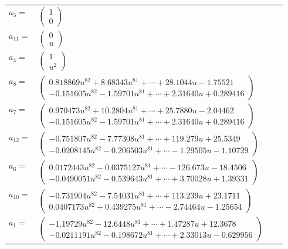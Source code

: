 \documentclass[1p]{elsarticle_modified}
\theoremstyle{definition}
\begin{document}
\begin{tabular}{m{7pt} m{180pt} m{7pt} m{180pt} }
\flushright $a_{5}=$&$\begin{pmatrix}1\\0\end{pmatrix}$ \\
\flushright $a_{11}=$&$\begin{pmatrix}0\\u\end{pmatrix}$ \\
\flushright $a_{4}=$&$\begin{pmatrix}1\\u^2\end{pmatrix}$ \\
\flushright $a_{8}=$&$\begin{pmatrix}0.818869 u^{82}+8.68343 u^{81}+\cdots+28.1044 u-1.75521\\-0.151605 u^{82}-1.59701 u^{81}+\cdots+2.31640 u+0.289416\end{pmatrix}$ \\
\flushright $a_{7}=$&$\begin{pmatrix}0.970473 u^{82}+10.2804 u^{81}+\cdots+25.7880 u-2.04462\\-0.151605 u^{82}-1.59701 u^{81}+\cdots+2.31640 u+0.289416\end{pmatrix}$ \\
\flushright $a_{12}=$&$\begin{pmatrix}-0.751807 u^{82}-7.77308 u^{81}+\cdots+119.279 u+25.5349\\-0.0208145 u^{82}-0.206503 u^{81}+\cdots-1.29505 u-1.10729\end{pmatrix}$ \\
\flushright $a_{6}=$&$\begin{pmatrix}0.0172443 u^{82}-0.0375127 u^{81}+\cdots-126.673 u-18.4506\\-0.0490051 u^{82}-0.539643 u^{81}+\cdots+3.70028 u+1.39331\end{pmatrix}$ \\
\flushright $a_{10}=$&$\begin{pmatrix}-0.731904 u^{82}-7.54031 u^{81}+\cdots+113.239 u+23.1711\\0.0407173 u^{82}+0.439275 u^{81}+\cdots-2.74464 u-1.25654\end{pmatrix}$ \\
\flushright $a_{1}=$&$\begin{pmatrix}-1.19729 u^{82}-12.6448 u^{81}+\cdots+1.47287 u+12.3678\\-0.0211191 u^{82}-0.198672 u^{81}+\cdots+2.33013 u-0.629956\end{pmatrix}$ \\

\end{tabular}
\end{document}
